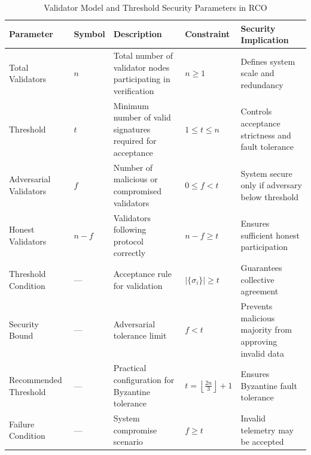 \begin{table}[htbp]
\footnotesize
\centering
\caption{Validator Model and Threshold Security Parameters in RCO}
\label{tab:validator-model}

\renewcommand{\arraystretch}{1.25}

\begin{tabularx}{\textwidth}{|p{2.5cm}|p{2cm}|X|X|X|}
\hline
\textbf{Parameter} & \textbf{Symbol} & \textbf{Description} & \textbf{Constraint} & \textbf{Security Implication} \\
\hline

Total Validators & $n$ & Total number of validator nodes participating in verification & $n \geq 1$ & Defines system scale and redundancy \\

\hline

Threshold & $t$ & Minimum number of valid signatures required for acceptance & $1 \leq t \leq n$ & Controls acceptance strictness and fault tolerance \\

\hline

Adversarial Validators & $f$ & Number of malicious or compromised validators & $0 \leq f < t$ & System secure only if adversary below threshold \\

\hline

Honest Validators & $n - f$ & Validators following protocol correctly & $n - f \geq t$ & Ensures sufficient honest participation \\

\hline

Threshold Condition & --- & Acceptance rule for validation & $|\{\sigma_i\}| \geq t$ & Guarantees collective agreement \\

\hline

Security Bound & --- & Adversarial tolerance limit & $f < t$ & Prevents malicious majority from approving invalid data \\

\hline

Recommended Threshold & --- & Practical configuration for Byzantine tolerance & $t = \left\lfloor \frac{2n}{3} \right\rfloor + 1$ & Ensures Byzantine fault tolerance \\

\hline

Failure Condition & --- & System compromise scenario & $f \geq t$ & Invalid telemetry may be accepted \\


\end{tabularx}
\end{table}
